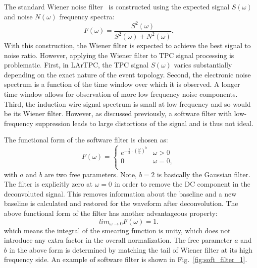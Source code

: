 The standard Wiener noise filter~\cite{wiener} is constructed using the expected 
signal $S(\omega)$ and noise $N(\omega)$ frequency spectra:
\begin{equation}
F(\omega) = \frac{S^2(\omega)}{S^2(\omega) + N^2(\omega)}.
\end{equation}
With this construction, the Wiener filter is expected to achieve the best signal to noise ratio. 
However, applying the Wiener filter to TPC signal processing is problematic. 
%
First, in LArTPC, the TPC signal $S(\omega)$ varies substantially
depending on the exact nature of the event topology.
%
Second, the electronic noise spectrum is a function of the time window
over which it is observed. A longer time window allows for observation
of more low frequency noise components.
%
Third, the induction wire signal spectrum is small at low frequency
and so would be its Wiener filter.  However, as discussed previously, 
a software filter with low-frequency suppression leads to large distortions 
of the signal and is thus not ideal.  

The functional form of the software filter is chosen as:
\begin{equation}
F(\omega) = 
\begin{cases}
e^{- \frac{1}{2} \cdot \left( \frac{\omega}{a} \right)^b} &  \omega >0 \\
0 &  \omega = 0, \\
\end{cases}
\end{equation}
with $a$ and $b$ are two free parameters. 
Note, $b=2$ is basically the Gaussian filter. 
The filter is explicitly zero at $\omega = 0$ in order to remove the DC component in the deconvoluted signal. 
This removes information about the baseline and a new baseline is calculated and restored for the waveform after 
deconvolution. The above functional form of the filter has another advantageous property:
\begin{equation}
lim_{\omega \rightarrow 0} F(\omega) = 1.
\end{equation}
which means the integral of the smearing function is unity, which does not introduce any
extra factor in the overall normalization. The free parameter $a$ and $b$ in the above 
form is determined by matching the tail of Wiener filter at its high frequency side. 
An example of software filter is shown in Fig.~\ref{fig:soft_filter_1}. 

